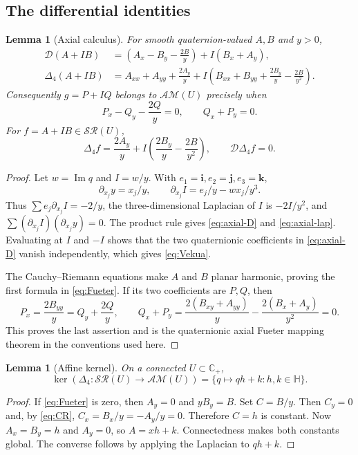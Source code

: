 \documentclass[11pt,a4paper]{article}
\numberwithin{equation}{section}
\newtheorem{lemma}[theorem]{Lemma}
\theoremstyle{definition}
\theoremstyle{remark}
\newcommand{\C}{\mathbb C}
\newcommand{\HH}{\mathbb H}
\newcommand{\SR}{\mathcal{SR}}
\newcommand{\AM}{\mathcal{AM}}
\newcommand{\D}{\mathcal D}
\newcommand{\lap}{\Delta_4}
\newcommand{\Ima}{\operatorname{Im}}
\newcommand{\ii}{\mathbf i}
\newcommand{\jj}{\mathbf j}
\newcommand{\kk}{\mathbf k}
\begin{document}
\subsection{The differential identities}
\begin{lemma}[Axial calculus]\label{lem:axial}
For smooth quaternion-valued $A,B$ and $y>0$,
\begin{align}
 \D(A+IB)&=\left(A_x-B_y-\frac{2B}{y}\right)
                 +I(B_x+A_y),\label{eq:axial-D}\\
 \lap(A+IB)&=A_{xx}+A_{yy}+\frac{2A_y}{y}
    +I\left(B_{xx}+B_{yy}+\frac{2B_y}{y}-\frac{2B}{y^2}\right).
 \label{eq:axial-lap}
\end{align}
Consequently $g=P+IQ$ belongs to $\AM(U)$ precisely when
\begin{equation}\label{eq:Vekua}
 P_x-Q_y-\frac{2Q}{y}=0,\qquad Q_x+P_y=0.
\end{equation}
For $f=A+IB\in\SR(U)$,
\begin{equation}\label{eq:Fueter}
 \lap f=\frac{2A_y}{y}
       +I\left(\frac{2B_y}{y}-\frac{2B}{y^2}\right),
 \qquad \D\lap f=0.
\end{equation}
\end{lemma}
\begin{proof}
Let $w=\Ima q$ and $I=w/y$. With $e_1=\ii,e_2=\jj,e_3=\kk$,
\[
 \partial_{x_j}y=x_j/y,\qquad
 \partial_{x_j}I=e_j/y-wx_j/y^3.
\]
Thus $\sum e_j\partial_{x_j}I=-2/y$, the three-dimensional Laplacian of
$I$ is $-2I/y^2$, and
$\sum (\partial_{x_j}I)(\partial_{x_j}y)=0$. The product rule gives
\eqref{eq:axial-D} and \eqref{eq:axial-lap}. Evaluating at $I$ and $-I$
shows that the two quaternionic coefficients in \eqref{eq:axial-D} vanish
independently, which gives \eqref{eq:Vekua}.

The Cauchy--Riemann equations make $A$ and $B$ planar harmonic, proving the
first formula in \eqref{eq:Fueter}. If its two coefficients are $P,Q$, then
\[
 P_x=\frac{2B_{yy}}y=Q_y+\frac{2Q}{y},\qquad
 Q_x+P_y=\frac{2(B_{xy}+A_{yy})}{y}
          -\frac{2(B_x+A_y)}{y^2}=0.
\]
This proves the last assertion and is the quaternionic axial Fueter
mapping theorem in the conventions used here.
\end{proof}

\begin{lemma}[Affine kernel]\label{lem:kernel}
On a connected $U\subset\C_+$,
\[
 \ker(\lap:\SR(U)\longrightarrow\AM(U))
       =\{q\mapsto qh+k:h,k\in\HH\}.
\]
\end{lemma}
\begin{proof}
If \eqref{eq:Fueter} is zero, then $A_y=0$ and $yB_y=B$.
Set $C=B/y$. Then $C_y=0$ and, by \eqref{eq:CR},
$C_x=B_x/y=-A_y/y=0$. Therefore $C=h$ is constant. Now
$A_x=B_y=h$ and $A_y=0$, so $A=xh+k$. Connectedness makes both constants
global. The converse follows by applying the Laplacian to $qh+k$.
\end{proof}
\end{document}
